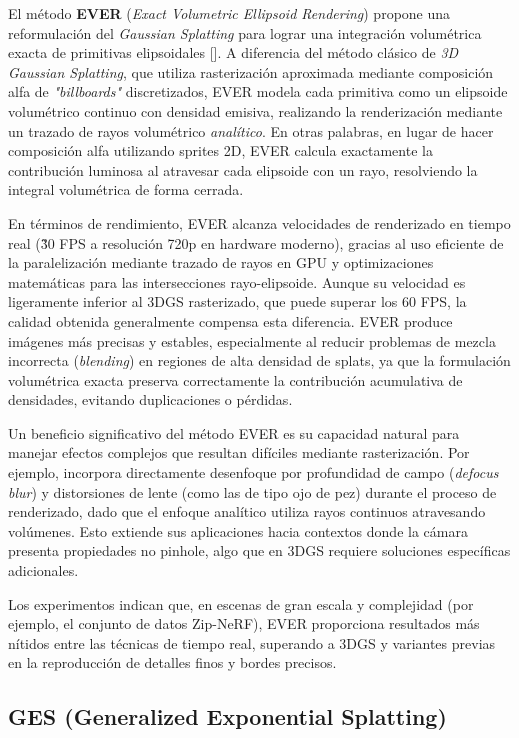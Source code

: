 El método \textbf{EVER} (\textit{Exact Volumetric Ellipsoid Rendering}) propone una reformulación del \textit{Gaussian Splatting} para lograr una integración volumétrica exacta de primitivas elipsoidales [\cite{mai2024ever}]. A diferencia del método clásico de \textit{3D Gaussian Splatting}, que utiliza rasterización aproximada mediante composición alfa de \textit{"billboards"} discretizados, EVER modela cada primitiva como un elipsoide volumétrico continuo con densidad emisiva, realizando la renderización mediante un trazado de rayos volumétrico \textit{analítico}. En otras palabras, en lugar de hacer composición alfa utilizando sprites 2D, EVER calcula exactamente la contribución luminosa al atravesar cada elipsoide con un rayo, resolviendo la integral volumétrica de forma cerrada.


En términos de rendimiento, EVER alcanza velocidades de renderizado en tiempo real (\~30 FPS a resolución 720p en hardware moderno), gracias al uso eficiente de la paralelización mediante trazado de rayos en GPU y optimizaciones matemáticas para las intersecciones rayo-elipsoide. Aunque su velocidad es ligeramente inferior al 3DGS rasterizado, que puede superar los 60 FPS, la calidad obtenida generalmente compensa esta diferencia. EVER produce imágenes más precisas y estables, especialmente al reducir problemas de mezcla incorrecta (\textit{blending}) en regiones de alta densidad de splats, ya que la formulación volumétrica exacta preserva correctamente la contribución acumulativa de densidades, evitando duplicaciones o pérdidas.

Un beneficio significativo del método EVER es su capacidad natural para manejar efectos complejos que resultan difíciles mediante rasterización. Por ejemplo, incorpora directamente desenfoque por profundidad de campo (\textit{defocus blur}) y distorsiones de lente (como las de tipo ojo de pez) durante el proceso de renderizado, dado que el enfoque analítico utiliza rayos continuos atravesando volúmenes. Esto extiende sus aplicaciones hacia contextos donde la cámara presenta propiedades no pinhole, algo que en 3DGS requiere soluciones específicas adicionales. 

Los experimentos indican que, en escenas de gran escala y complejidad (por ejemplo, el conjunto de datos Zip-NeRF), EVER proporciona resultados más nítidos entre las técnicas de tiempo real, superando a 3DGS y variantes previas en la reproducción de detalles finos y bordes precisos.
\subsection{GES (Generalized Exponential Splatting)}

